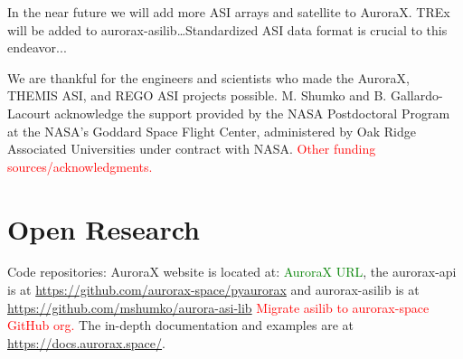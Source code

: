 \documentclass[draft]{agujournal2019}
\begin{document}
In the near future we will add more ASI arrays and satellite to AuroraX. TREx will be added to aurorax-asilib\dots Standardized ASI data format is crucial to this endeavor...  


\acknowledgments
We are thankful for the engineers and scientists who made the AuroraX, THEMIS ASI, and REGO ASI projects possible. M. Shumko and B. Gallardo-Lacourt acknowledge the support provided by the NASA Postdoctoral Program at the NASA’s Goddard Space Flight Center, administered by Oak Ridge Associated Universities under contract with NASA. \textcolor{red}{Other funding sources/acknowledgments.}

\section*{Open Research}
\noindent Code repositories: AuroraX website is located at: \textcolor{green}{AuroraX URL}, the aurorax-api is at \url{https://github.com/aurorax-space/pyaurorax} and aurorax-asilib is at \url{https://github.com/mshumko/aurora-asi-lib} \textcolor{red}{Migrate asilib to aurorax-space GitHub org.} The in-depth documentation and examples are at \url{https://docs.aurorax.space/}.


% 
\end{document}
